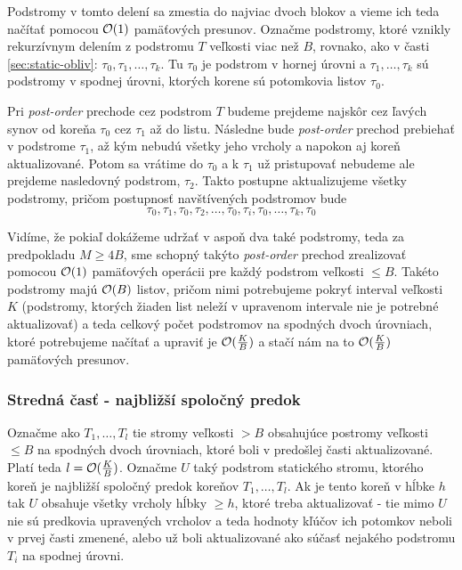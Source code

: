 Podstromy v tomto delení sa zmestia do najviac dvoch blokov a vieme ich teda načítať pomocou $\mathcal{O}(1)$ pamäťových presunov. Označme podstromy, ktoré vznikly rekurzívnym \vEB delením z podstromu $T$ veľkosti viac než $B$, rovnako, ako v časti \ref{sec:static-obliv}: $\tau_0, \tau_1, \dotsc, \tau_k$. Tu $\tau_0$ je podstrom v hornej úrovni a $\tau_1,\dotsc,\tau_k$ sú podstromy v spodnej úrovni, ktorých korene sú potomkovia listov $\tau_0$.

Pri \emph{post-order} prechode cez podstrom $T$ budeme prejdeme najskôr cez ľavých synov od koreňa $\tau_0$ cez $\tau_1$ až do listu. Následne bude \emph{post-order} prechod prebiehať v podstrome $\tau_1$, až kým nebudú všetky jeho vrcholy a napokon aj koreň aktualizované. Potom sa vrátime do $\tau_0$ a k $\tau_1$ už pristupovať nebudeme ale prejdeme nasledovný podstrom, $\tau_2$. Takto postupne aktualizujeme všetky podstromy, pričom postupnosť navštívených podstromov bude
\[
\tau_0, \tau_1, \tau_0, \tau_2, \dotsc, \tau_0, \tau_i, \tau_0, \dotsc, \tau_k, \tau_0
\]

Vidíme, že pokiaľ dokážeme udržať v \cache aspoň dva také podstromy, teda za predpokladu $M \ge 4B$, sme schopný takýto \emph{post-order} prechod zrealizovať pomocou $\mathcal{O}(1)$ pamäťových operácii pre každý podstrom veľkosti $\le B$. Takéto podstromy majú $\mathcal{O}(B)$ listov, pričom  nimi potrebujeme pokryť interval veľkosti $K$ (podstromy, ktorých žiaden list neleží v upravenom intervale nie je potrebné aktualizovať) a teda celkový počet podstromov na spodných dvoch úrovniach, ktoré potrebujeme načítať a upraviť je $\mathcal{O}(\frac{K}{B})$ a stačí nám na to $\mathcal{O}(\frac{K}{B})$ pamäťových presunov.

\subsubsection{Stredná časť - najbližší spoločný predok}
Označme ako $T_1,\dotsc,T_l$ tie stromy veľkosti $>B$ obsahujúce postromy veľkosti $\le B$ na spodných dvoch úrovniach, ktoré boli v predošlej časti aktualizované. Platí teda $l = \mathcal{O}(\frac{K}{B})$. Označme $U$ taký podstrom statického stromu, ktorého koreň je najbližší spoločný predok koreňov $T_1,\dotsc,T_l$. Ak je tento koreň v hĺbke $h$ tak $U$ obsahuje všetky vrcholy hĺbky $\ge h$, ktoré treba aktualizovať - tie mimo $U$ nie sú predkovia upravených vrcholov a teda hodnoty kľúčov ich potomkov neboli v prvej časti zmenené, alebo už boli aktualizované ako súčasť nejakého podstromu $T_i$ na spodnej úrovni.

